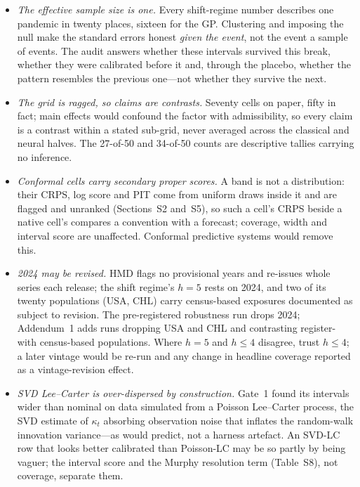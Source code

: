 \begin{itemize}
\item \emph{The effective sample size is one.} Every shift-regime number
  describes one pandemic in twenty places, sixteen for the GP. Clustering and
  imposing the null make the standard errors honest \emph{given the event}, not
  the event a sample of events. The audit answers whether these intervals
  survived this break, whether they were calibrated before it and, through the
  placebo, whether the pattern resembles the previous one---not whether they
  survive the next.
\item \emph{The grid is ragged, so claims are contrasts.} Seventy cells on
  paper, fifty in fact; main effects would confound the factor with
  admissibility, so every claim is a contrast within a stated sub-grid, never
  averaged across the classical and neural halves. The 27-of-50 and 34-of-50
  counts are descriptive tallies carrying no inference.
\item \emph{Conformal cells carry secondary proper scores.} A band is not a
  distribution: their CRPS, log score and PIT come from uniform draws inside it
  and are flagged and unranked (Sections~S2 and~S5), so such a cell's CRPS
  beside a native cell's compares a convention with a forecast; coverage, width
  and interval score are unaffected. Conformal predictive systems would remove
  this.
\item \emph{2024 may be revised.} HMD flags no provisional years and re-issues
  whole series each release; the shift regime's $h=5$ rests on 2024, and two of
  its twenty populations (USA, CHL) carry census-based exposures documented as
  subject to revision. The pre-registered robustness run drops 2024; Addendum~1
  adds runs dropping USA and CHL and contrasting register- with census-based
  populations. Where $h=5$ and $h\le4$ disagree, trust $h\le4$; a later vintage
  would be re-run and any change in headline coverage reported as a
  vintage-revision effect.
\item \emph{SVD Lee--Carter is over-dispersed by construction.} Gate~1 found
  its intervals wider than nominal on data simulated from a Poisson Lee--Carter
  process, the SVD estimate of $\kappa_t$ absorbing observation noise that
  inflates the random-walk innovation variance---as
  \citet{girosi2007understanding} would predict, not a harness artefact. An
  SVD-LC row that looks better calibrated than Poisson-LC may be so partly by
  being vaguer; the interval score and the Murphy resolution term (Table~S8),
  not coverage, separate them.

\end{itemize}
